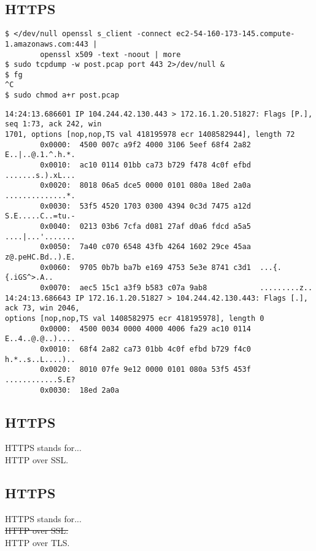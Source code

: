 \documentclass[xga]{xdvislides}
\begin{document}
\subsection{HTTPS}
\begin{verbatim}
$ </dev/null openssl s_client -connect ec2-54-160-173-145.compute-1.amazonaws.com:443 |
        openssl x509 -text -noout | more
$ sudo tcpdump -w post.pcap port 443 2>/dev/null &
$ fg
^C
$ sudo chmod a+r post.pcap
\end{verbatim}
\small
\begin{verbatim}
14:24:13.686601 IP 104.244.42.130.443 > 172.16.1.20.51827: Flags [P.], seq 1:73, ack 242, win
1701, options [nop,nop,TS val 418195978 ecr 1408582944], length 72
        0x0000:  4500 007c a9f2 4000 3106 5eef 68f4 2a82  E..|..@.1.^.h.*.
        0x0010:  ac10 0114 01bb ca73 b729 f478 4c0f efbd  .......s.).xL...
        0x0020:  8018 06a5 dce5 0000 0101 080a 18ed 2a0a  ..............*.
        0x0030:  53f5 4520 1703 0300 4394 0c3d 7475 a12d  S.E.....C..=tu.-
        0x0040:  0213 03b6 7cfa d081 27af d0a6 fdcd a5a5  ....|...'.......
        0x0050:  7a40 c070 6548 43fb 4264 1602 29ce 45aa  z@.peHC.Bd..).E.
        0x0060:  9705 0b7b ba7b e169 4753 5e3e 8741 c3d1  ...{.{.iGS^>.A..
        0x0070:  aec5 15c1 a3f9 b583 c07a 9ab8            .........z..
14:24:13.686643 IP 172.16.1.20.51827 > 104.244.42.130.443: Flags [.], ack 73, win 2046,
options [nop,nop,TS val 1408582975 ecr 418195978], length 0
        0x0000:  4500 0034 0000 4000 4006 fa29 ac10 0114  E..4..@.@..)....
        0x0010:  68f4 2a82 ca73 01bb 4c0f efbd b729 f4c0  h.*..s..L....)..
        0x0020:  8010 07fe 9e12 0000 0101 080a 53f5 453f  ............S.E?
        0x0030:  18ed 2a0a
\end{verbatim}
\Normalsize

\subsection{HTTPS}
HTTPS stands for... \\

HTTP over SSL.

\subsection{HTTPS}
HTTPS stands for... \\

\sout{HTTP over SSL.} \\

HTTP over TLS.
\end{document}
